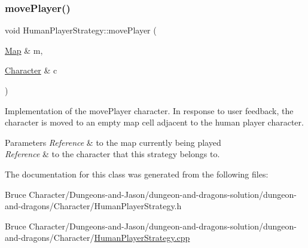 \subsubsection{\texorpdfstring{move\+Player()}{movePlayer()}}
{\footnotesize\ttfamily void Human\+Player\+Strategy\+::move\+Player (\begin{DoxyParamCaption}\item[{\hyperlink{class_map}{Map} \&}]{m,  }\item[{\hyperlink{class_character}{Character} \&}]{c }\end{DoxyParamCaption})}

Implementation of the move\+Player character. In response to user feedback, the character is moved to an empty map cell adjacent to the human player character. 
\begin{DoxyParams}{Parameters}
{\em Reference} & to the map currently being played \\
\hline
{\em Reference} & to the character that this strategy belongs to. \\
\hline
\end{DoxyParams}


The documentation for this class was generated from the following files\+:\begin{DoxyCompactItemize}
\item 
Bruce Character/\+Dungeons-\/and-\/\+Jason/dungeon-\/and-\/dragons-\/solution/dungeon-\/and-\/dragons/\+Character/Human\+Player\+Strategy.\+h\item 
Bruce Character/\+Dungeons-\/and-\/\+Jason/dungeon-\/and-\/dragons-\/solution/dungeon-\/and-\/dragons/\+Character/\hyperlink{_human_player_strategy_8cpp}{Human\+Player\+Strategy.\+cpp}\end{DoxyCompactItemize}
